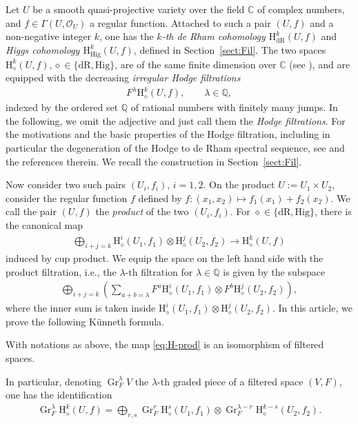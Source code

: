 \documentclass[pdftex]{sigma}
\newcommand{\CC}{\mathbb{C}}
\newcommand{\QQ}{\mathbb{Q}}
\newcommand{\sO}{\mathscr{O}}
\newcommand{\dR}{\mathrm{dR}}
\newcommand{\Hig}{\mathrm{Hig}}
\newcommand{\coH}{\mathrm{H}}
\newcommand{\dRH}{\diamond}
\newcommand{\Gr}{\operatorname{Gr}}
\begin{document}
Let $U$ be a smooth quasi-projective variety over the field $\CC$ of complex numbers, and $f\in\Gamma(U,\sO_U)$ a regular function. Attached to such a pair $(U,f)$ and a non-negative integer $k$, one has the
\textit{$k$-th de Rham cohomology $\coH_\dR^k(U,f)$} and \textit{Higgs cohomology $\coH_\Hig^k(U,f)$}, defined in Section~\ref{sect:Fil}. The two spaces $\coH_\dRH^k(U,f), \dRH\in\{\dR, \Hig\}$, are of the same finite dimension over $\CC$ (see \cite[Remark~1.3.3]{ESY}), and are equipped with the decreasing \textit{irregular Hodge filtrations}
\begin{gather*} F^\lambda \coH_\dRH^k(U,f), \qquad \lambda \in \QQ, \end{gather*}
indexed by the ordered set $\QQ$ of rational numbers with finitely many jumps. In the following, we omit the adjective and just call them the \textit{Hodge filtrations}. For the motivations and the basic properties of the Hodge filtration, including in particular the degeneration of the Hodge to de Rham spectral sequence, see \cite{ESY, KKP} and the references therein. We recall the construction in Section~\ref{sect:Fil}.

Now consider two such pairs $(U_i,f_i)$, $i=1,2$. On the product $U:=U_1\times U_2$, consider the regular function $f$ defined by $f\colon (x_1,x_2) \mapsto f_1(x_1) + f_2(x_2)$. We call the pair $(U,f)$ the \textit{product} of the two $(U_i,f_i)$. For $\dRH \in \{\dR, \Hig\}$, there is the canonical map
\begin{gather}\label{eq:H-prod}
\bigoplus_{i+j=k} \coH_\dRH^i(U_1,f_1) \otimes \coH_\dRH^j(U_2,f_2) \to \coH^k_\dRH(U,f)
\end{gather}
induced by cup product. We equip the space on the left hand side with the product filtration, i.e., the $\lambda$-th filtration for $\lambda\in\QQ$ is given by the subspace
\begin{gather*} \bigoplus_{i+j=k}\left(\sum_{a +b = \lambda} F^a\coH^i_\dRH(U_1,f_1)\otimes F^b\coH^j_\dRH(U_2,f_2) \right), \end{gather*}
where the inner sum is taken inside $\coH_\dRH^i(U_1,f_1)\otimes \coH_\dRH^j(U_2,f_2)$. In this article, we prove the following K\"unneth formula.

\begin{theorem}\label{Thm:Kunneth}
With notations as above, the map \eqref{eq:H-prod} is an isomorphism of filtered spaces.
\end{theorem}

In particular, denoting $\Gr_F^\lambda V$ the $\lambda$-th graded piece of a filtered space $(V,F)$, one has the identification
\begin{gather*} \Gr_F^\lambda\coH_\dRH^k(U,f) = \bigoplus_{r,s} \Gr_F^r\coH_\dRH^s(U_1,f_1) \otimes \Gr_F^{\lambda-r}\coH_\dRH^{k-s}(U_2,f_2). \end{gather*}
\end{document}
